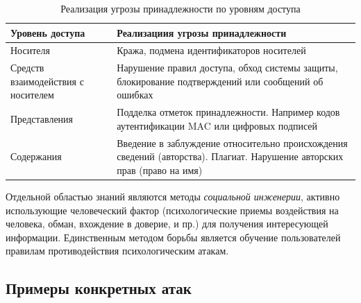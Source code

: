 \begin{table}[ht]
    \caption{Реализация угрозы принадлежности по уровням доступа}
    \label{t:ownerThreatByLevels}
    \centering
    \begin{tabular}[c]{|p{}|p{}|}
        \hline\hline
        Уровень доступа &
            Реализациия угрозы принадлежности\\ \hline\hline
        Носителя & 
            Кража, подмена идентификаторов носителей\\ \hline
        Средств взаимодействия с носителем & 
            Нарушение правил доступа, обход системы защиты, 
            блокирование подтверждений или сообщений об ошибках\\ \hline
        Представления & 
            Подделка отметок принадлежности. Например кодов 
            аутентификации MAC или цифровых подписей\\ \hline
        Содержания & Введение в заблуждение относительно происхождения 
        сведений (авторства). Плагиат. Нарушение авторских прав (право на имя)\\ \hline
    \end{tabular}
\end{table}


Отдельной областью знаний являются методы \emph{социальной инженерии}, активно использующие  человеческий фактор (психологические приемы воздействия на человека, обман, вхождение в доверие, и пр.) для получения интересующей информации. Единственным методом борьбы является обучение пользователей правилам противодействия психологическим атакам.


\subsection{Примеры конкретных атак}


